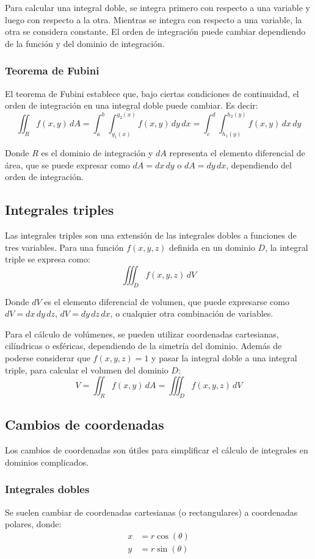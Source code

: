 Para calcular una integral doble, se integra primero con respecto a una variable y luego con respecto a la otra.
Mientras se integra con respecto a una variable, la otra se considera constante.
El orden de integración puede cambiar dependiendo de la función y del dominio de integración.

\subsubsection{Teorema de Fubini}
El teorema de Fubini establece que, bajo ciertas condiciones de continuidad, el orden de integración en una integral doble puede cambiar. 
Es decir:
\[
\iint_R f(x,y) \, dA =\int_a^b \int_{g_1(x)}^{g_2(x)} f(x,y)\,dy\,dx=\int_c^d \int_{h_1(y)}^{h_2(y)} f(x,y)\,dx\,dy
\]

Donde \(R\) es el dominio de integración y \(dA\) representa el elemento diferencial de área, que se puede expresar como \(dA = dx\,dy\) o \(dA = dy\,dx\), dependiendo del orden de integración.

\subsection{Integrales triples}
Las integrales triples son una extensión de las integrales dobles a funciones de tres variables.
Para una función \(f(x, y, z)\) definida en un dominio \(D\), la integral triple se expresa como:
\[
\iiint_D f(x, y, z) \, dV
\]

Donde \(dV\) es el elemento diferencial de volumen, que puede expresarse como
\(dV = dx\,dy\,dz\), \(dV = dy\,dz\,dx\), o cualquier otra combinación de variables.

Para el cálculo de volúmenes, se pueden utilizar coordenadas cartesianas, cilíndricas o esféricas, dependiendo de la simetría del dominio.
Además de poderse considerar que \(f(x, y, z) = 1\) y pasar la integral doble a una integral triple, para calcular el volumen del dominio \(D\):
\[
V = \iint _R f(x,y) \,dA = \iiint_D f(x,y,z)\,dV
\]

\subsection{Cambios de coordenadas}
Los cambios de coordenadas son útiles para simplificar el cálculo de integrales en dominios complicados.

\subsubsection{Integrales dobles}
Se suelen cambiar de coordenadas cartesianas (o rectangulares) a coordenadas polares, donde:
\begin{align*}
x &= r \cos(\theta) \\
y &= r \sin(\theta)
\end{align*}

